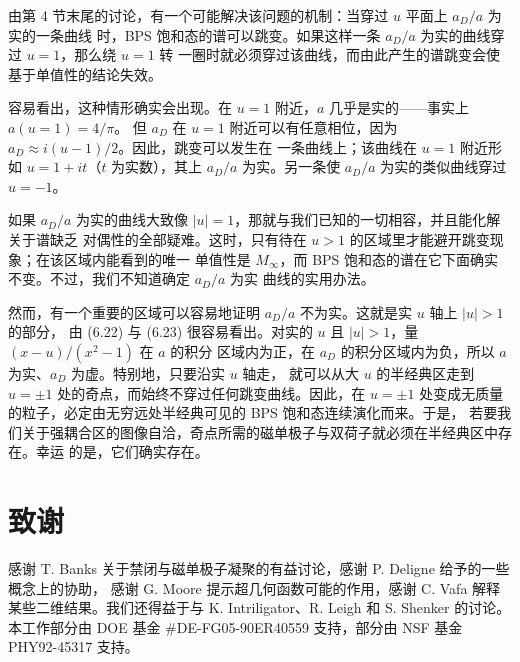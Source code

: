 \documentclass[11pt,a4paper,UTF8,fontset=fandol]{ctexart}
\theoremstyle{plain}
\theoremstyle{definition}
\begin{document}
由第 4 节末尾的讨论，有一个可能解决该问题的机制：当穿过 $u$ 平面上 $a_D/a$ 为实的一条曲线
时，BPS 饱和态的谱可以跳变。如果这样一条 $a_D/a$ 为实的曲线穿过 $u=1$，那么绕 $u=1$ 转
一圈时就必须穿过该曲线，而由此产生的谱跳变会使基于单值性的结论失效。

容易看出，这种情形确实会出现。在 $u=1$ 附近，$a$ 几乎是实的——事实上 $a(u=1)=4/\pi$。
但 $a_D$ 在 $u=1$ 附近可以有任意相位，因为 $a_D\approx i(u-1)/2$。因此，跳变可以发生在
一条曲线上；该曲线在 $u=1$ 附近形如 $u=1+it$（$t$ 为实数），其上 $a_D/a$ 为实。另一条使
$a_D/a$ 为实的类似曲线穿过 $u=-1$。

如果 $a_D/a$ 为实的曲线大致像 $|u|=1$，那就与我们已知的一切相容，并且能化解关于谱缺乏
对偶性的全部疑难。这时，只有待在 $u>1$ 的区域里才能避开跳变现象；在该区域内能看到的唯一
单值性是 $M_\infty$，而 BPS 饱和态的谱在它下面确实不变。不过，我们不知道确定 $a_D/a$ 为实
曲线的实用办法。

然而，有一个重要的区域可以容易地证明 $a_D/a$ 不为实。这就是实 $u$ 轴上 $|u|>1$ 的部分，
由 (6.22) 与 (6.23) 很容易看出。对实的 $u$ 且 $|u|>1$，量 $(x-u)/(x^2-1)$ 在 $a$ 的积分
区域内为正，在 $a_D$ 的积分区域内为负，所以 $a$ 为实、$a_D$ 为虚。特别地，只要沿实 $u$ 轴走，
就可以从大 $u$ 的半经典区走到 $u=\pm1$ 处的奇点，而始终不穿过任何跳变曲线。因此，在
$u=\pm1$ 处变成无质量的粒子，必定由无穷远处半经典可见的 BPS 饱和态连续演化而来。于是，
若要我们关于强耦合区的图像自洽，奇点所需的磁单极子与双荷子就必须在半经典区中存在。幸运
的是，它们确实存在。

\section*{致谢}

感谢 T. Banks 关于禁闭与磁单极子凝聚的有益讨论，感谢 P. Deligne 给予的一些概念上的协助，
感谢 G. Moore 提示超几何函数可能的作用，感谢 C. Vafa 解释某些二维结果。我们还得益于与
K. Intriligator、R. Leigh 和 S. Shenker 的讨论。本工作部分由 DOE 基金
\#DE-FG05-90ER40559 支持，部分由 NSF 基金 PHY92-45317 支持。
\end{document}
